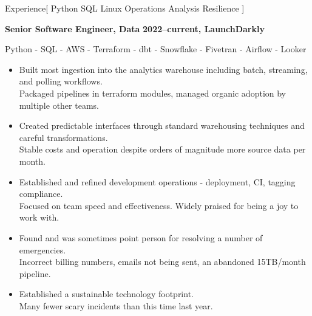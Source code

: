 \documentclass[11pt,a4paper]{article}
\begin{document}
\sloppy  %


\vspace{1em}

\begin{mysection}{Experience}[
    Python
    \textbullet{} SQL
    \textbullet{} Linux
    \textbullet{} Operations
    \textbullet{} Analysis
    \textbullet{} Resilience
]

  \begin{addmargin}[0.5em]{0em}
    {\large\bfseries Senior Software Engineer, Data}%
    \hfill {\bfseries 2022--current, LaunchDarkly}%
    \begin{adjustwidth}{1ex}{0ex}
      Python - SQL - AWS - Terraform - dbt - Snowflake - Fivetran - Airflow
      - Looker

      \begin{itemize}
          [label=-, topsep=0pt, itemsep=0.5ex, parsep=0pt, leftmargin=1em]

      \item Built most ingestion into the analytics warehouse including batch,
            streaming, and polling workflows.
      \\    Packaged pipelines in terraform modules, managed organic adoption
            by multiple other teams.

      \item Created predictable interfaces through standard warehousing 
            techniques and careful transformations.
      \\    Stable costs and operation despite orders of magnitude more
            source data per month.

      \item Established and refined development operations - deployment, CI,
            tagging compliance.
      \\    Focused on team speed and effectiveness.
            Widely praised for being a joy to work with.

      \item Found and was sometimes point person for resolving a number of
            emergencies.
      \\    Incorrect billing numbers, emails not being sent,
            an abandoned 15TB/month pipeline.
      \item Established a sustainable technology footprint.
      \\    Many fewer scary incidents than this time last year.


\end{itemize}
\end{adjustwidth}
\end{addmargin}
\end{mysection}
\end{document}
